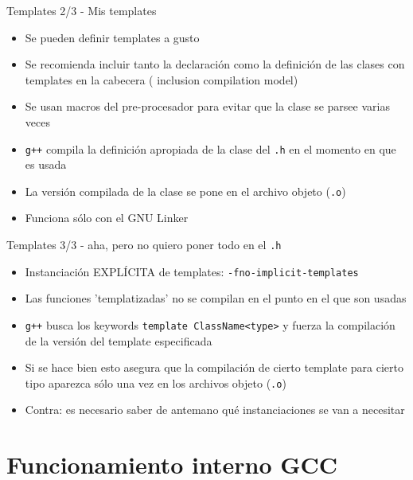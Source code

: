 \documentclass[xetex]{beamer}
\begin{document}
\begin{frame}[fragile]{Templates 2/3 - Mis templates}
\begin{itemize}
  \item Se pueden definir templates a gusto
  \item Se recomienda incluir tanto la declaración como la definición de las clases
con templates en la cabecera ( inclusion compilation model)
  \item Se usan macros del pre-procesador para evitar que la clase se parsee varias veces
  \item \verb=g++= compila la definición apropiada de la clase del \verb=.h= en el momento en que es usada
  \item La versión compilada de la clase se pone en el archivo objeto (\verb=.o=)
  \item Funciona sólo con el GNU Linker
\end{itemize}
\end{frame}

\begin{frame}[fragile]{Templates 3/3 - aha, pero no quiero poner todo en el {\tt .h}}  
\begin{itemize}
  \item Instanciación EXPLÍCITA de templates: \verb=-fno-implicit-templates=
  \item Las funciones 'templatizadas' no se compilan en el punto en el que son usadas
  \item \verb=g++= busca los keywords \verb=template ClassName<type>= y fuerza la compilación de la versión del template especificada
  \item Si se hace bien esto asegura que la compilación de cierto template para
cierto tipo aparezca sólo una vez en los archivos objeto (\verb=.o=)
  \item Contra: es necesario saber de antemano qué instanciaciones se van a necesitar
\end{itemize}
\end{frame}

\section{Funcionamiento interno GCC}
\end{document}
